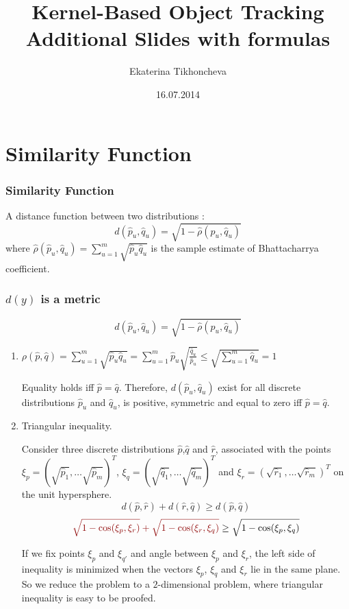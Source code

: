 \documentclass[hyperref={pdfpagelabels=false}]{beamer}
\title{Kernel-Based Object Tracking \\
Additional Slides with formulas}
\author{Ekaterina Tikhoncheva}
\date{16.07.2014}
\begin{document}
\begin{frame}
\titlepage
\end{frame}



\section{Similarity Function}
\begin{frame}
\frametitle{Similarity Function}

\begin{block}{}
	A distance function between two distributions :
		$$d(\hat{p}_u,\hat{q}_u) = \sqrt{1-\hat{\rho}(\hat{p}_u, \hat{q}_u)}$$
	where $\hat{\rho}(\hat{p}_u,\hat{q}_u) = \sum_{u=1}^{m}\sqrt{\hat{p}_u \hat{q}_u}$ is the sample estimate of {\color{darkred} Bhattacharrya coefficient}.
\end{block}

\end{frame}


\begin{frame}[allowframebreaks]
\frametitle{$d(y)$ is a metric}
$$d(\hat{p}_u,\hat{q}_u) = \sqrt{1-\hat{\rho}(\hat{p}_u, \hat{q}_u)}$$
\begin{enumerate}
\item $\rho(\hat{p},\hat{q})=\sum_{u=1}^{m}\sqrt{\hat{p}_u \hat{q}_u} = \sum_{u=1}^{m}\hat{p}_u\sqrt{\frac{\hat{q}_u}{\hat{p}_u}} \le \sqrt{\sum_{u=1}^{m}\hat{q}_u} = 1 $

\vspace{5pt}
Equality holds iff  $\hat{p}=\hat{q}$. Therefore, $d(\hat{p}_u,\hat{q}_u)$ exist for all discrete distributions $\hat{p}_u$ and $\hat{q}_u$, is positive, symmetric and equal to zero iff $\hat{p}=\hat{q}$.

\newpage 

\small
\item Triangular inequality.

Consider three discrete distributions $\hat{p}$,$\hat{q}$ and $\hat{r}$, associated with the points $\xi_p=(\sqrt{\hat{p}_1},\dots \sqrt{\hat{p}_m})^T$, $\xi_q=(\sqrt{\hat{q}_1},\dots \sqrt{\hat{q}_m})^T$ and $\xi_r=(\sqrt{\hat{r}_1},\dots \sqrt{\hat{r}_m})^T$ on the unit hypersphere.
$$d(\hat{p},\hat{r})+ d(\hat{r},\hat{q})\ge d(\hat{p},\hat{q})$$
$${\color{darkred} \sqrt{1-\cos(\xi_p,\xi_r)}+ \sqrt{1-\cos(\xi_r,\xi_q)}}\ge \sqrt{1-\cos(\xi_p,\xi_q)}$$

If we fix points $\xi_p$ and $\xi_{q'}$ and angle between $\xi_p$ and $\xi_{r}$, the left side of inequality is minimized when the vectors $\xi_p$, $\xi_q$ and $\xi_r$ lie in the same plane. So we reduce the problem to a $2$-dimensional problem, where triangular inequality is easy to be proofed.
\end{enumerate}

\end{frame}
\end{document}
